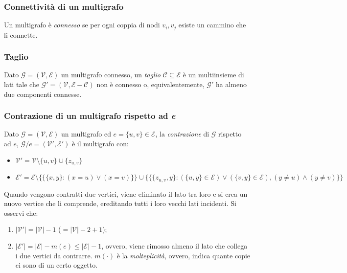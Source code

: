 \subsubsection*{Connettività di un multigrafo}
Un multigrafo è \textit{connesso} se per ogni coppia di nodi $v_i, v_j$ esiste un cammino che li connette.

\subsubsection*{Taglio}
Dato $\mathcal{G}=(\mathcal{V}, \mathcal{E})$ un multigrafo connesso, un \textit{taglio} $\mathcal{C} \subseteq \mathcal{E}$ è un multiinsieme di lati tale che $\mathcal{G}{}'=(\mathcal{V}, \mathcal{E}-\mathcal{C})$ non è connesso o, equivalentemente, $\mathcal{G}{}'$ ha almeno due componenti connesse.

\subsubsection*{Contrazione di un multigrafo rispetto ad \textit{e}}
\label{definizione_contrazione}
Dato $\mathcal{G}=(\mathcal{V}, \mathcal{E})$ un multigrafo ed $e=\{u,v\} \in \mathcal{E}$, la \textit{contrazione} di $\mathcal{G}$ rispetto ad $e$, $\mathcal{G}/e=(\mathcal{V}{}', \mathcal{E}{}')$ è il multigrafo con:
\begin{itemize}
    \item[] $\mathcal{V}{}'=\mathcal{V} \setminus \{u, v\} \cup \{z_{u,v}\}$
    \item[] $\mathcal{E}{}'=\mathcal{E} \setminus \{\{\{x, y\}: (x=u) \vee (x=v)\}\} \cup \{\{\{z_{u,v}, y\}: (\{u,y\} \in \mathcal{E}) \vee (\{v,y\} \in \mathcal{E}), (y\neq u) \wedge (y \neq v) \}\}$ %
\end{itemize}
Quando vengono contratti due vertici, viene eliminato il lato tra loro e 
si crea un nuovo vertice che li comprende, ereditando tutti i loro vecchi lati 
incidenti. Si osservi che:
\begin{enumerate}
    \item $|\mathcal{V}'| = |\mathcal{V}| - 1$ ($= |\mathcal{V}| - 2 + 1$);
    \item $|\mathcal{E}'| = |\mathcal{E}| - m(e) \le |\mathcal{E}| - 1$, ovvero, viene 
    rimosso almeno il lato che collega i due vertici da contrarre. $m(\cdot)$ è la 
    \textit{molteplicità}, ovvero, indica quante copie ci sono di un certo oggetto.
\end{enumerate}

